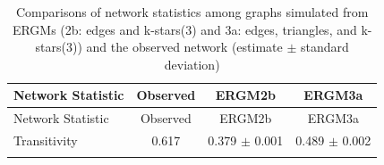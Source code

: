 \documentclass[12pt,twoside]{amherstthesis}
\begin{document}
  \begin{longtable}[]{@{}lccc@{}}
  \caption{Comparisons of network statistics among graphs simulated from
  ERGMs (2b: edges and k-stars(\(3\)) and 3a: edges, triangles, and
  k-stars(\(3\))) and the observed network (estimate \(\pm\) standard
  deviation) \label{tab:ergm2b3a}}\tabularnewline
  \toprule
  \begin{minipage}[b]{0.20\columnwidth}\raggedright\strut
  Network Statistic\strut
  \end{minipage} & \begin{minipage}[b]{0.12\columnwidth}\centering\strut
  Observed\strut
  \end{minipage} & \begin{minipage}[b]{0.27\columnwidth}\centering\strut
  ERGM2b\strut
  \end{minipage} & \begin{minipage}[b]{0.29\columnwidth}\centering\strut
  ERGM3a\strut
  \end{minipage}\tabularnewline
  \midrule
  \endfirsthead
  \toprule
  \begin{minipage}[b]{0.20\columnwidth}\raggedright\strut
  Network Statistic\strut
  \end{minipage} & \begin{minipage}[b]{0.12\columnwidth}\centering\strut
  Observed\strut
  \end{minipage} & \begin{minipage}[b]{0.27\columnwidth}\centering\strut
  ERGM2b\strut
  \end{minipage} & \begin{minipage}[b]{0.29\columnwidth}\centering\strut
  ERGM3a\strut
  \end{minipage}\tabularnewline
  \midrule
  \endhead
  \begin{minipage}[t]{0.20\columnwidth}\raggedright\strut
  Transitivity\strut
  \end{minipage} & \begin{minipage}[t]{0.12\columnwidth}\centering\strut
  0.617\strut
  \end{minipage} & \begin{minipage}[t]{0.27\columnwidth}\centering\strut
  0.379 \(\pm\) 0.001\strut
  \end{minipage} & \begin{minipage}[t]{0.29\columnwidth}\centering\strut
  0.489 \(\pm\) 0.002\strut
  \end{minipage}\tabularnewline
  \begin{minipage}[t]{0.20\columnwidth}\raggedright\strut

\end{minipage}
\end{longtable}
\end{document}
